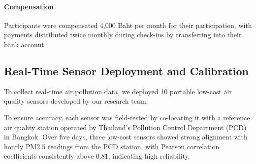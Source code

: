 

\paragraph{Compensation}
Participants were compensated 4,000 Baht per month for their participation, with payments distributed twice monthly during check-ins by transferring into their bank account.

\subsection{Real-Time Sensor Deployment and Calibration}

To collect real-time air pollution data, we deployed 10 portable low-cost air quality sensors developed by our research team.

To ensure accuracy, each sensor was field-tested by co-locating it with a reference air quality station operated by Thailand’s Pollution Control Department (PCD) in Bangkok.
Over five days, three low-cost sensors showed strong alignment with hourly PM2.5 readings from the PCD station, with Pearson correlation coefficients consistently above 0.81, indicating high reliability.



